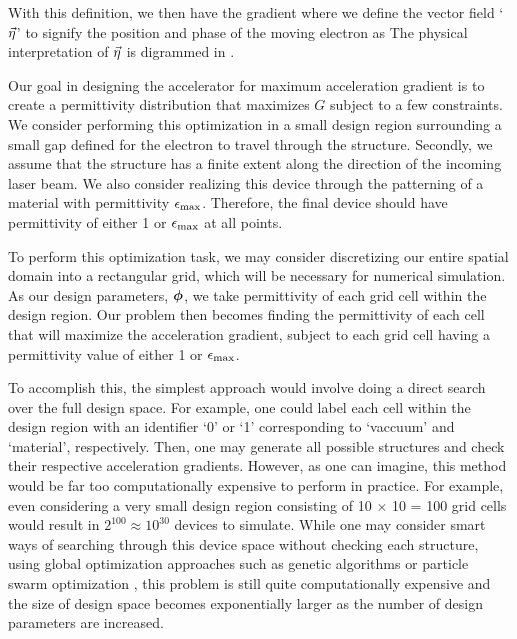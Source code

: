 With this definition, we then have the gradient
%
%
where we define the vector field `$\vec{\eta}$' to signify the position and phase of the moving electron as
The physical interpretation of $\vec{\eta}$ is digrammed in .


Our goal in designing the accelerator for maximum acceleration gradient is to create a permittivity distribution that maximizes $G$ subject to a few constraints.
We consider performing this optimization in a small design region surrounding a small gap defined for the electron to travel through the structure.
Secondly, we assume that the structure has a finite extent along the direction of the incoming laser beam.
We also consider realizing this device through the patterning of a material with permittivity $\epsilon_\textrm{max}$.
Therefore, the final device should have permittivity of either 1 or $\epsilon_\textrm{max}$ at all points.

To perform this optimization task, we may consider discretizing our entire spatial domain into a rectangular grid, which will be necessary for numerical simulation.
As our design parameters, $\bm{\phi}$, we take permittivity of each grid cell within the design region.
Our problem then becomes finding the permittivity of each cell that will maximize the acceleration gradient, subject to each grid cell having a permittivity value of either 1 or $\epsilon_\textrm{max}$.

To accomplish this, the simplest approach would involve doing a direct search over the full design space.
For example, one could label each cell within the design region with an identifier `0' or `1' corresponding to `vaccuum' and `material', respectively.
Then, one may generate all possible structures and check their respective acceleration gradients.
However, as one can imagine, this method would be far too computationally expensive to perform in practice.
For example, even considering a very small design region consisting of 10 $\times$ 10 = 100 grid cells would result in $2^{100} \approx 10^{30}$ devices to simulate.
While one may consider smart ways of searching through this device space without checking each structure, using global optimization approaches such as genetic algorithms \cite{whitley_genetic_1994} or particle swarm optimization \cite{noauthor_particle_nodate}, this problem is still quite computationally expensive and the size of design space becomes exponentially larger as the number of design parameters are increased.


